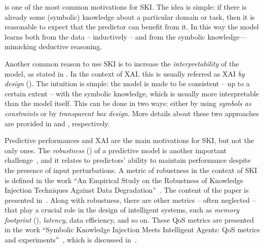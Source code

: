  is one of the most common motivations for \gls{SKI}.
%
The idea is simple: if there is already some (symbolic) knowledge about a particular domain or task, then it is reasonable to expect that the predictor can benefit from it.
%
In this way the model learns both from the data -- inductively -- and from the symbolic knowledge---mimicking deductive reasoning.


Another common reason to use \gls{SKI} is to increase the \emph{interpretability} of the model, as stated in .
%
In the context of \gls{XAI}, this is usually referred as \gls{XAI} \emph{by design} ().
%
The intuition is simple: the model is made to be consistent -- up to a certain extent -- with the symbolic knowledge, which is usually more interpretable than the model itself.
%
This can be done in two ways: either by using \emph{symbols as constraints} or by \emph{transparent box design}.
%
More details about these two approaches are provided in  and , respectively.


Predictive performances and \gls{XAI} are the main motivations for \gls{SKI}, but not the only ones.
%
The \emph{robustness} () of a predictive model is another important challenge~\cite{DBLP:conf/eccv/LiuCZH18}, and it relates to predictors' ability to maintain performance despite the presence of input perturbations.
%
A metric of robustness in the context of \gls{SKI} is defined in the work ``An Empirical Study on the Robustness of Knowledge Injection Techniques Against Data Degradation''~\cite{DBLP:conf/woa/RafanelliMACO24}.
%
The content of the paper is presented in~.
%
Along with robustness, there are other metrics -- often neglected -- that play a crucial role in the design of intelligent systems, such as \emph{memory footprint} (), \emph{latency}, data efficiency, and so on.
%
These \gls{QoS} metrics are presented in the work ``Symbolic Knowledge Injection Meets Intelligent Agents: QoS metrics and experiments''~\cite{DBLP:journals/aamas/AgiolloRMCO23}, which is discussed in~.


